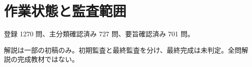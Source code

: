 \chapter{作業状態と監査範囲}
登録 1270 問、主分類確認済み 727 問、要旨確認済み 701 問。
\par 解説は一部の初稿のみ。初期監査と最終監査を分け、最終完成は未判定。全問解説の完成教材ではない。
